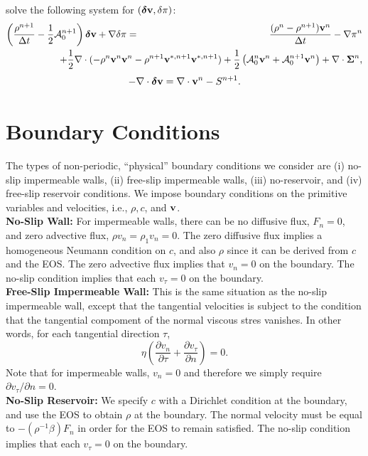 \documentclass[final]{siamltex}
\def\vb {{\bf v}}
\def\deltab {\boldsymbol{\delta}}
\def\Sigmab {\boldsymbol{\Sigma}}
\def\half   {\frac{1}{2}}
\begin{document}
solve the following system for $(\deltab\vb,\delta\pi)$:
\begin{eqnarray}
\left(\frac{\rho^{n+1}}{\Delta t} - \half\mathcal{A}_0^{n+1}\right)\deltab\vb + \nabla\delta\pi &=& \frac{(\rho^n-\rho^{n+1})\vb^n}{\Delta t} -\nabla\pi^n\nonumber\\
&&\hspace{-1.25in}+ \half\nabla\cdot(-\rho^n\vb^n\vb^n - \rho^{n+1}\vb^{*,n+1}\vb^{*,n+1}) + \half\left(\mathcal{A}^n_0\vb^n + \mathcal{A}^{n+1}_0\vb^n\right) + \nabla\cdot\Sigmab^n,
\end{eqnarray}
\begin{equation}
-\nabla\cdot\deltab\vb = \nabla\cdot\vb^n - S^{n+1}.
\end{equation}

\section{Boundary Conditions}
The types of non-periodic, ``physical'' boundary conditions we consider are 
(i) no-slip impermeable walls,
(ii) free-slip impermeable walls,
(iii) no-reservoir, and
(iv) free-slip reservoir conditions.
We impose boundary conditions on the primitive variables and velocities,
i.e., $\rho,c$, and $\vb$.\\

{\bf No-Slip Wall:}  For impermeable walls, there can be no diffusive
flux, $F_n=0$, and zero advective flux, $\rho v_n = \rho_1 v_n = 0$.  The zero
diffusive flux implies a homogeneous Neumann condition on $c$, and also $\rho$ since it
can be derived from $c$ and the EOS.  The zero advective flux implies that $v_n=0$ on the
boundary.  The no-slip condition implies that each $v_{\tau}=0$ on the boundary.\\

{\bf Free-Slip Impermeable Wall:}  This is the same situation as the no-slip impermeable
wall, except that the tangential velocities is subject to the condition that the
tangential compoment of the normal viscous stres vanishes.  In other words, for each 
tangential direction $\tau$,
\begin{equation}
\eta\left(\frac{\partial v_n}{\partial\tau} + \frac{\partial v_{\tau}}{\partial n}\right) = 0.\label{eq:free slip}
\end{equation}
Note that for impermeable walls, $v_n=0$ and therefore we simply require $\partial v_{\tau}/\partial n=0$.\\

{\bf No-Slip Reservoir:} We specify $c$ with a Dirichlet condition at the boundary, 
and use the EOS to obtain $\rho$ at the
boundary.  The normal velocity must be equal to $-(\rho^{-1}\beta)F_n$ in order for
the EOS to remain satisfied.  The no-slip condition implies that each $v_{\tau}=0$ on the 
boundary.\\
\end{document}
